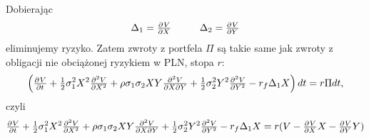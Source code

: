 \documentclass[12pt]{article}
\providecommand{\pd}[3][]{\ensuremath{
\ifinner
\tfrac{\partial{^{#1}}#2}{\partial{#3^{#1}}}
\else
\dfrac{\partial{^{#1}}#2}{\partial{#3^{#1}}}
\fi
}}
\begin{document}
Dobierając 
\begin{align*}
    \Delta_1 = \pd{V}{X} \hspace{1cm}    \Delta_2 = \pd{V}{Y}
\end{align*}
eliminujemy ryzyko. Zatem zwroty z portfela $\Pi$ są takie same jak zwroty z obligacji nie obciążonej ryzykiem w PLN, stopa $r$:
\begin{align*}
   \left( \pd{V}{t} + \tfrac{1}{2} \sigma_1^2 X^2 \pd[2]{V}{X}  + \rho \sigma_1 \sigma_2 X Y \tfrac{\partial^2 V}{\partial X\partial Y} + \tfrac{1}{2} \sigma_2^2 Y^2 \pd[2]{V}{Y} - r_f \Delta_1 X \right) dt = r \Pi dt,
\end{align*}
czyli 
\begin{align}\label{eq:2}
    \pd{V}{t} + \tfrac{1}{2} \sigma_1^2 X^2 \pd[2]{V}{X}  + \rho \sigma_1 \sigma_2 X Y \tfrac{\partial^2 V}{\partial X\partial Y} + \tfrac{1}{2} \sigma_2^2 Y^2 \pd[2]{V}{Y} - r_f \Delta_1 X = r (V - \pd{V}{X}X - \pd{V}{Y}Y)
\end{align}
\end{document}
